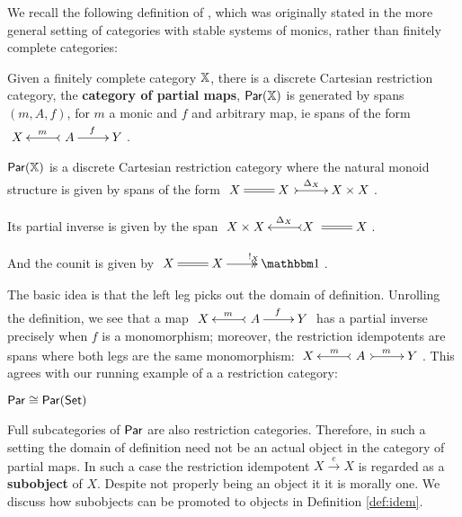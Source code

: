 \begin{theorem}
%
\end{theorem}
We recall the following definition of \cite[\S 3]{cockett}, which was originally stated in the more general setting of categories with stable systems of monics, rather than finitely complete categories:
\begin{definition}
Given a finitely complete category $\mathbb{X}$,  there is a discrete Cartesian restriction category, the {\bf category of partial maps}, $\mathsf{Par}(\mathbb{X})$ is generated by spans $(m,A,f)$, for $m$ a monic and $f$ and arbitrary map, ie spans of the form
$
\xymatrix{
X 
&
\ A \ar@{>->}[l]_m \ar[r]^{f}
&
Y
}
$.

 $\mathsf{Par}(\mathbb{X})$ is a discrete Cartesian restriction category where the natural monoid structure is given by spans of the form 
$
\xymatrix{
X 
&
X \ \ar@{=}[l] \ar@{>->}[r]^{\Delta_X \ \ \ }
&
X\times X
}
$.


Its partial inverse is given by the span  
$
\xymatrix{
X \times X
&
X \ \ar@{=}[r] \ar@{>->}[l]_{\ \ \ \Delta_X}
&
X
}
$.

And the counit is given by 
$
\xymatrix{
X 
&
X \ar@{=}[l] \ar@{->>}[r]^{!_X}
&
\one
}
$.
\end{definition}
The basic idea is that the left leg picks out the domain of definition.  
Unrolling the definition, we see that a map
$
\xymatrix{
X 
&
\ A  \ar@{>->}[l]_m \ar[r]^{f}
&
Y
}
$ 
has a partial inverse precisely when $f$ is a monomorphism; moreover, the restriction idempotents are spans where both legs are the same monomorphism:
$
\xymatrix{
X 
&
\ A\  \ar@{>->}[l]_m \ar@{>->}[r]^{m}
&
Y
}
$.
This agrees with our running example of a a restriction category:
\begin{example}
$\mathsf{Par}\cong\mathsf{Par}(\mathsf{Set})$
\end{example}
Full subcategories of $\mathsf{Par}$ are also restriction categories.  Therefore, in such a setting the domain of definition need not be an actual object in the category of partial maps.  In such a case the restriction idempotent $X\xrightarrow{e}X$ is regarded as a {\bf subobject} of $X$.  Despite not properly being an object it it is morally one.  We discuss how subobjects can be promoted to objects in Definition \ref{def:idem}.



